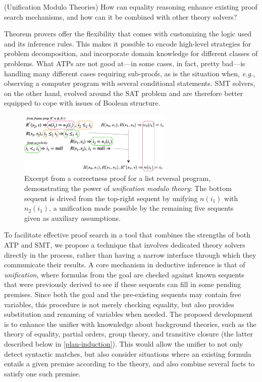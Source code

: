 \begin{researchquestion}(Unification Modulo Theories) How can equality reasoning enhance existing proof search mechanisms, and how can it be combined with other theory solvers?
\end{researchquestion}

Theorem provers offer the flexibility that comes with customizing the logic used and its inference rules.
This makes it possible to encode high-level strategies for problem decomposition, and incorporate domain knowledge for different classes of problems.
What ATPs are not good at---in some cases, in fact, pretty bad---is
handling many different cases requiring sub-proofs,
as is the situation when, \emph{e.g.}, observing a computer program with several conditional statements.
SMT solvers, on the other hand, evolved around the SAT problem and are therefore better equipped to cope with issues of Boolean structure.

\begin{figure}
\centering
\includegraphics[width=0.65\textwidth]{img/unification-modulo-theories.pdf}
\caption{Excerpt from a correctness proof for a list reversal program, demonstrating the power of \emph{unification modulo theory}:
The bottom sequent is drived from the top-right sequent by unifying $n(i_1)$ with $n_2(i_1)$, a unification made possible by the remaining five sequents given as auxiliary assumptions.}
\label{unification:example}
\end{figure}

To facilitate effective proof search in a tool that combines the strengths of both ATP and SMT,
we propose a technique that involves dedicated theory solvers directly in the process, rather than having a narrow interface through which they communicate their results.
A core mechanism in deductive inference is that of \emph{unification}, where formulas from the goal are checked against known sequents that were previously derived to see if these sequents can fill in some pending premises.
Since both the goal and the pre-existing sequents may contain free variables, this procedure is not merely checking equality, but also provides substitution and renaming of variables when needed.
The proposed development is to enhance the unifier with knownledge about background theories, such as the theory of equality, partial orders, group theory, and transitive closure (the latter described below in \autoref{plan-induction}).
This would allow the unifier to not only detect syntactic matches, but also consider situations where an existing formula entails a given premise according to the theory,
and also combine several facts to satisfy one such premise.

